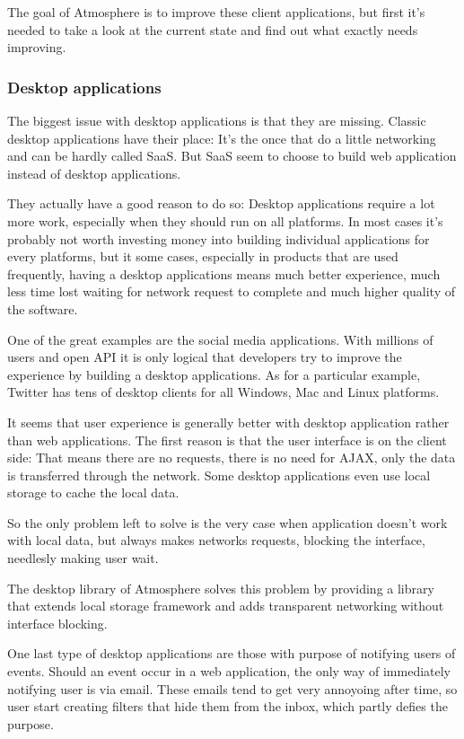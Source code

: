The goal of Atmosphere is to improve these client applications, but first it's needed to take a look at the current state and find out what exactly needs improving.

\subsubsection{Desktop applications}

The biggest issue with desktop applications is that they are missing. Classic desktop applications have their place: It’s the once that do a little networking and can be hardly called SaaS. But SaaS seem to choose to build web application instead of desktop applications.

They actually have a good reason to do so: Desktop applications require a lot more work, especially when they should run on all platforms. In most cases it’s probably not worth investing money into building individual applications for every platforms, but it some cases, especially in products that are used frequently, having a desktop applications means much better experience, much less time lost waiting for network request to complete and much higher quality of the software.

One of the great examples are the social media applications. With millions of users and open API  it is only logical that developers try to improve the experience by building a desktop applications. As for a particular example, Twitter has tens of desktop clients for all Windows, Mac and Linux platforms.

It seems that user experience is generally better with desktop application rather than web applications. The first reason is that the user interface is on the client side: That means there are no requests, there is no need for AJAX, only the data is transferred through the network. Some desktop applications even use local storage to cache the local data.

So the only problem left to solve is the very case when application doesn’t work with local data, but always makes networks requests, blocking the interface, needlesly making user wait. 

The desktop library of Atmosphere solves this problem by providing a library that extends local storage framework and adds transparent networking without interface blocking. 

One last type of desktop applications are those with purpose of notifying users of events. Should an event occur in a web application, the only way of immediately notifying user is via email. These emails tend to get very annoyoing after time, so user start creating filters that hide them from the inbox, which partly defies the purpose.

